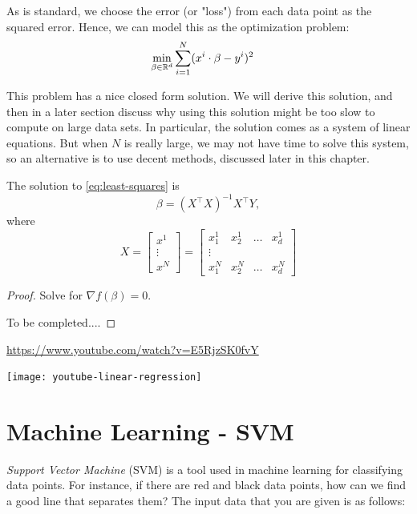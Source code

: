 \documentclass[../open-optimization/open-optimization.tex]{subfiles}
\begin{document}
As is standard, we choose the error (or "loss") from each data point as the squared error.  Hence, we can model this as the optimization problem:
\begin{align}
\label{eq:least-squares}
\min_{\beta \in {\mathbb{R}}^d} & \sum_{i=1}^N (x^i \cdot \beta - y^i)^2
\end{align}

This problem has a nice closed form solution.  We will derive this solution, and then in a later section discuss why using this solution might be too  slow to compute on large data sets.  In particular, the solution comes as a system of linear equations.  But when $N$ is really large, we may not have time to solve this system, so an alternative is to use decent methods, discussed later in this chapter.

\begin{theorem}
The solution to \eqref{eq:least-squares} is 
\begin{equation}
\beta = (X^\top X)^{-1} X^\top Y,
\end{equation}
where 
$$X = 
\begin{bmatrix}
x^1\\
\vdots \\
x^N
\end{bmatrix}
= 
\begin{bmatrix}
x^1_1 & x^1_2 & \dots & x^1_d\\
\vdots \\
x^N_1 & x^N_2 & \dots & x^N_d
\end{bmatrix}
$$
\end{theorem}
\begin{proof}
Solve for $\nabla f(\beta) = 0$.

To be completed....
\end{proof}


\url{https://www.youtube.com/watch?v=E5RjzSK0fvY}

\texttt{[image: youtube-linear-regression]}



\section{Machine Learning - SVM}



\emph{Support Vector Machine} (SVM) is a tool used in machine learning for classifying data points.   For instance, if there are red and black data points, how can we find a good line that separates them?  The input data that you are given is as follows:
\end{document}

